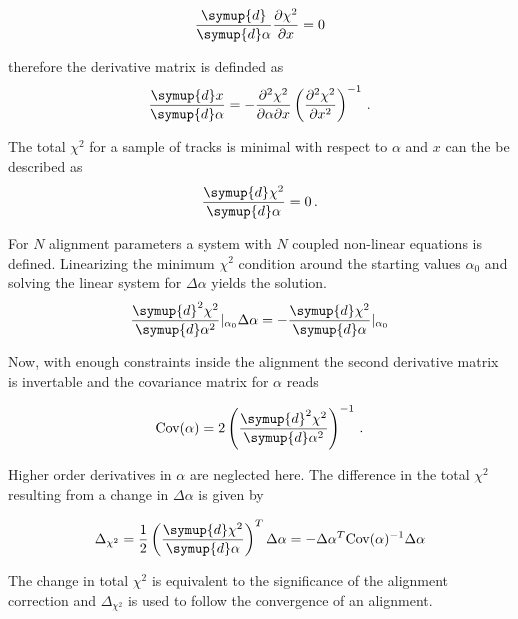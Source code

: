 \begin{equation}
  \frac{\symup{d}}{\symup{d}\alpha}\frac{\partial \chi^2}{\partial x} = 0
\end{equation}

therefore the derivative matrix is definded as
\begin{equation}
  \frac{\symup{d}x}{\symup{d}\alpha} = -\frac{\partial^2\chi^2}{\partial\alpha\partial x} \left( \frac{\partial^2\chi^2}{\partial x^2} \right)^{-1}\,.
\end{equation}

The total $\chi^2$ for a sample of tracks is minimal with respect to $\alpha$ and $x$ can the be described as
\begin{equation}
  \frac{\symup{d}\chi^2}{\symup{d}\alpha} = 0\,.
\end{equation}

For $N$ alignment parameters a system with $N$ coupled non-linear equations is defined.
Linearizing the minimum $\chi^2$ condition around the starting values $\alpha_0$ and solving the linear system for $\Delta\alpha$ yields the solution.
\begin{equation}
  \frac{\symup{d}^2\chi^2}{\symup{d}\alpha^2}\vert_{\alpha_0} \Delta\alpha =
  -\frac{\symup{d}\chi^2}{\symup{d}\alpha}\vert_{\alpha_0}
\end{equation}

Now, with enough constraints inside the alignment the second derivative matrix is invertable and the covariance matrix for $\alpha$ reads

\begin{equation*}
  \text{Cov}(\alpha) = 2 \left( \frac{\symup{d}^2\chi^2}{\symup{d}\alpha^2} \right)^{-1}\,.
\end{equation*}

Higher order derivatives in $\alpha$ are neglected here. The difference in the total $\chi^2$ resulting from a change in $\Delta\alpha$ is given by

\begin{equation*}
  \Delta_{\chi^2} = \frac{1}{2} \left( \frac{\symup{d}\chi^2}{\symup{d}\alpha} \right)^T \Delta\alpha = -\Delta\alpha^T \text{Cov}(\alpha)^{-1}\Delta\alpha
\end{equation*}

The change in total $\chi^2$ is equivalent to the significance of the alignment correction and $\Delta_{\chi^2}$ is used to follow the convergence of an alignment.
